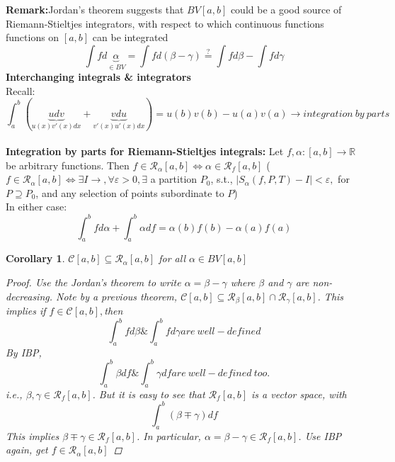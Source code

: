 \documentclass[12pt]{article}
\newtheorem{corollary}{Corollary}
\begin{document}
\textbf{Remark:}Jordan's theorem suggests that $BV[a,b]$ could be a good source of Riemann-Stieltjes integrators, with respect to which continuous functions functions on $[a,b]$ can be integrated $$\int f d\underbrace{\alpha}_{\in BV}=\int f d(\beta-\gamma)\overset{?}{=}\int f d\beta -\int f d\gamma$$
\textbf{Interchanging integrals \& integrators}
\\Recall: $$\int_{a}^{b}\left(\underbrace{udv}_{u(x)v'(x)dx}+\underbrace{vdu}_{v'(x)u'(x)dx}\right)=u(b)v(b)-u(a)v(a)\xrightarrow{} integration\ by\ parts$$\\
\textbf{Integration by parts for Riemann-Stieltjes integrals:}
Let $f,\alpha:[a,b] \to \mathbb{R}$ be arbitrary functions. Then $f \in \mathcal{R}_{\alpha}[a,b] \Leftrightarrow  \alpha \in \mathcal{R}_{f}[a,b]$ ($f\in \mathcal{R}_{\alpha}[a,b]\Leftrightarrow \exists I \to, \forall \varepsilon >0, \exists$ a partition $P_0$, s.t., $|S_{\alpha}(f,P,T)-I|<\varepsilon,$ for $P \supseteq P_0$, and any selection of points subordinate to $P$)\\In either case:$$\int_{a}^{b}fd\alpha+\int_{a}^{b}\alpha df=\alpha(b)f(b)-\alpha(a)f(a)$$
\begin{corollary}
$\mathcal{C}[a,b]\subseteq \mathcal{R}_{\alpha}[a,b]$ for all $\alpha \in BV[a,b]$
\begin{proof}
Use the Jordan's theorem to write $\alpha=\beta-\gamma$ where $\beta$ and $\gamma$ are non-decreasing. Note by a previous theorem, $\mathcal{C}[a,b]\subseteq \mathcal{R}_{\beta}[a,b]\cap \mathcal{R}_{\gamma}[a,b]$. This implies if $f \in \mathcal{C}[a,b],$then $$\int_{a}^{b}f d \beta\& \int_{a}^{b} f d\gamma are\ well-defined$$By IBP, $$\int_{a}^{b}\beta df \& \int_{a}^{b} \gamma d f are\ well-defined\ too.$$i.e., $\beta, \gamma \in \mathcal{R}_{f}[a,b]$. But it is easy to see that $\mathcal{R}_{f}[a,b]$ is a vector space, with $$\int_{a}^{b}(\beta \mp \gamma)df$$This implies $\beta \mp \gamma \in \mathcal{R}_{f}[a,b]$. In particular, $\alpha=\beta-\gamma \in \mathcal{R}_{f}[a,b]$. Use IBP again, get $f \in \mathcal{R}_{\alpha}[a,b]$
\end{proof}
\end{corollary}
\end{document}
